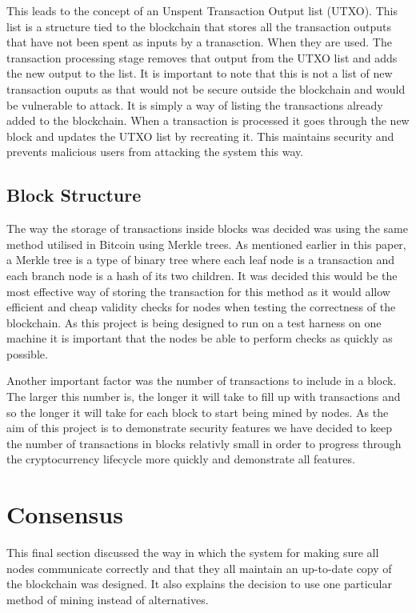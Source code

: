 \documentclass{l4proj}
\begin{document}
This leads to the concept of an Unspent Transaction Output list (UTXO). This list is a structure tied to the blockchain
that stores all the transaction outputs that have not been spent as inputs by a tranasction. When they are used.
The transaction processing stage removes that output from the UTXO list and adds the new output to the list.
It is important to note that this is not a list of new transaction ouputs as that would not be secure outside the
blockchain and would be vulnerable to attack. It is simply a way of listing the transactions already added to the
blockchain. When a transaction is processed it goes through the new block and updates the UTXO list by recreating 
it. This maintains security and prevents malicious users from attacking the system this way.

\subsection{Block Structure}
The way the storage of transactions inside blocks was decided was using the same method utilised in Bitcoin using
Merkle trees. As mentioned earlier in this paper, a Merkle tree is a type of binary tree where each leaf node
is a transaction and each branch node is a hash of its two children. It was decided this would be the most effective
way of storing the transaction for this method as it would allow efficient and cheap validity checks for nodes
when testing the correctness of the blockchain. As this project is being designed to run on a test harness on one
machine it is important that the nodes be able to perform checks as quickly as possible.

Another important factor was the number of transactions to include in a block. The larger this number is, the
longer it will take to fill up with transactions and so the longer it will take for each block to start being
mined by nodes. As the aim of this project is to demonstrate security features we have decided to keep the 
number of transactions in blocks relativly small in order to progress through the cryptocurrency lifecycle
more quickly and demonstrate all features.

\section{Consensus}
This final section discussed the way in which the system for making sure all nodes communicate correctly and
that they all maintain an up-to-date copy of the blockchain was designed. It also explains the decision to 
use one particular method of mining instead of alternatives.
\end{document}
